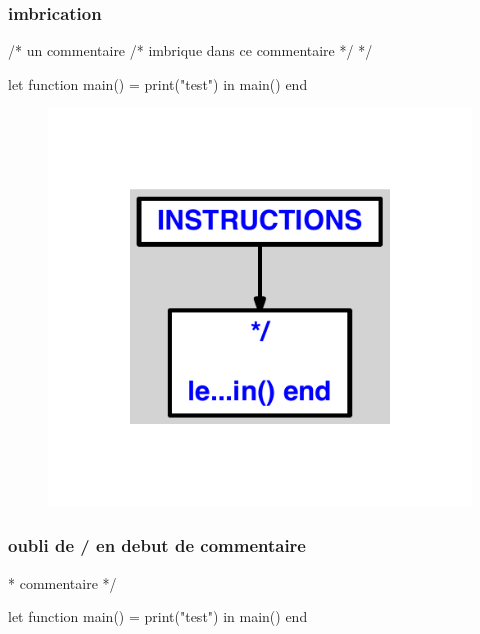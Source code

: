 \documentclass{article}
\begin{document}
\subsubsection{imbrication}
\begin{verbatimtab}
/* 
	un commentaire
	/* imbrique dans ce commentaire */
*/

let
	function main() = print("test")
in main() end
\end{verbatimtab}
\begin{figure}[H]\centering\includegraphics[max width=\textwidth]{ast/ast_143.pdf}\end{figure}\subsubsection{oubli de / en debut de commentaire}
\begin{verbatimtab}
* commentaire */

let
	function main() = print("test")
in main() end
\end{verbatimtab}
\end{document}
